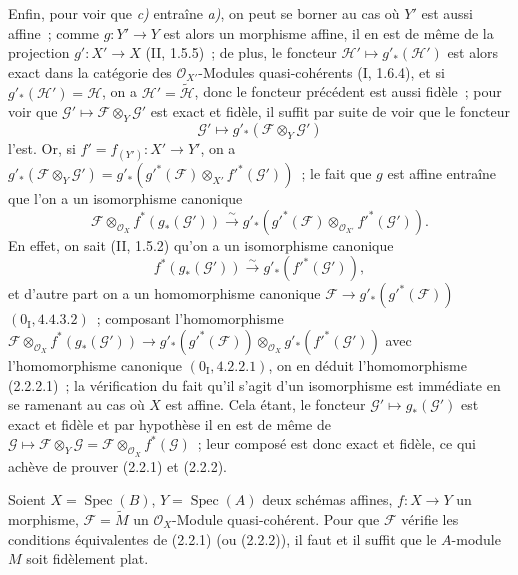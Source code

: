 Enfin, pour voir que \emph{c)} entraîne \emph{a)}, on peut se borner au cas
où $Y'$ est aussi affine~; comme $g:Y'\to Y$ est alors un morphisme affine,
il en est de même de la projection $g':X'\to X$ (II, 1.5.5)~; de plus, le
foncteur $\mathscr H'\mapsto g'_*(\mathscr H')$ est alors exact dans la
catégorie des $\mathcal O_{X'}$-Modules quasi-cohérents (I, 1.6.4), et si
$g'_*(\mathscr H')=\mathscr H$, on a $\mathscr H'=\widetilde{\mathscr H}$,
donc le foncteur précédent est aussi fidèle~; pour voir que
$\mathscr G'\mapsto\mathscr F\otimes_Y\mathscr G'$ est exact et fidèle, il
suffit par suite de voir que le foncteur
\[
\mathscr G'\mapsto g'_*(\mathscr F\otimes_Y\mathscr G')
\]
l'est. Or, si $f'=f_{(Y')}:X'\to Y'$, on a
$g'_*(\mathscr F\otimes_Y\mathscr G')
=g'_*(g'^*(\mathscr F)\otimes_{X'}f'^*(\mathscr G'))$~; le fait que $g$ est
affine entraîne que l'on a un isomorphisme canonique
\begin{equation}
\tag{2.2.2.1}
\label{IV.2.2.2.1-fr}
\mathscr F\otimes_{\mathcal O_X}f^*(g_*(\mathscr G'))
\xrightarrow{\sim}
g'_*(g'^*(\mathscr F)\otimes_{\mathcal O_{X'}}f'^*(\mathscr G')).
\end{equation}
En effet, on sait (II, 1.5.2) qu'on a un isomorphisme canonique
\[
f^*(g_*(\mathscr G'))\xrightarrow{\sim}g'_*(f'^*(\mathscr G')),
\]
et d'autre part on a un homomorphisme canonique
$\mathscr F\to g'_*(g'^*(\mathscr F))$ $(0_{\mathrm I},4.4.3.2)$~;
composant l'homomorphisme
$\mathscr F\otimes_{\mathcal O_X}f^*(g_*(\mathscr G'))
\to g'_*(g'^*(\mathscr F))\otimes_{\mathcal O_X}g'_*(f'^*(\mathscr G'))$
avec l'homomorphisme canonique $(0_{\mathrm I},4.2.2.1)$, on en déduit
l'homomorphisme (2.2.2.1)~; la vérification du fait qu'il s'agit d'un
isomorphisme est immédiate en se ramenant au cas où $X$ est affine. Cela
étant, le foncteur $\mathscr G'\mapsto g_*(\mathscr G')$ est exact et fidèle
et par hypothèse il en est de même de
$\mathscr G\mapsto\mathscr F\otimes_Y\mathscr G
=\mathscr F\otimes_{\mathcal O_X}f^*(\mathscr G)$~; leur composé est donc
exact et fidèle, ce qui achève de prouver (2.2.1) et (2.2.2).

\begin{corollary}[2.2.3]
\label{IV.2.2.3-fr}
Soient $X=\operatorname{Spec}(B)$, $Y=\operatorname{Spec}(A)$ deux schémas
affines, $f:X\to Y$ un morphisme, $\mathscr F=\widetilde M$ un
$\mathcal O_X$-Module quasi-cohérent. Pour que $\mathscr F$ vérifie les
conditions équivalentes de (2.2.1) (ou (2.2.2)), il faut et il suffit que le
$A$-module $M$ soit fidèlement plat.
\end{corollary}

